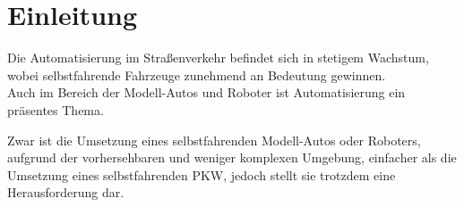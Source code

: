\section{Einleitung}
Die Automatisierung im Straßenverkehr befindet sich in stetigem Wachstum, wobei selbstfahrende Fahrzeuge zunehmend an Bedeutung gewinnen. \\
Auch im Bereich der Modell-Autos und Roboter ist Automatisierung ein präsentes Thema.

Zwar ist die Umsetzung eines selbstfahrenden Modell-Autos oder Roboters, aufgrund der vorhersehbaren und weniger komplexen Umgebung, 
einfacher als die Umsetzung eines selbstfahrenden PKW, jedoch stellt sie trotzdem eine Herausforderung dar.